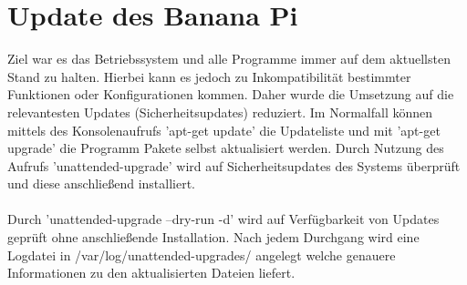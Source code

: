 \section{Update des Banana Pi}
Ziel war es das Betriebssystem und alle Programme immer auf dem aktuellsten Stand zu halten. Hierbei kann es jedoch zu Inkompatibilität bestimmter Funktionen  oder Konfigurationen kommen. Daher wurde die Umsetzung auf die relevantesten Updates (Sicherheitsupdates) reduziert. Im Normalfall können mittels des Konsolenaufrufs  'apt-get update' die Updateliste und mit 'apt-get upgrade' die Programm Pakete selbst aktualisiert werden. Durch Nutzung des Aufrufs 'unattended-upgrade' wird auf Sicherheitsupdates des Systems überprüft und diese anschließend installiert.\\
\\
Durch 'unattended-upgrade --dry-run -d' wird auf Verfügbarkeit von Updates geprüft ohne anschließende Installation. Nach jedem Durchgang wird eine Logdatei in /var/log/unattended-upgrades/ angelegt welche genauere Informationen zu den aktualisierten Dateien liefert. \cite{update}
